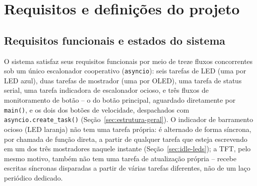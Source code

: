 \documentclass[12pt,a4paper]{article}
\begin{document}
\section{Requisitos e definições do projeto}
\label{sec:requisitos}

\subsection{Requisitos funcionais e estados do sistema}

O sistema satisfaz seus requisitos funcionais por meio de treze fluxos concorrentes sob um único escalonador cooperativo (\texttt{asyncio}): seis tarefas de LED (uma por LED azul), duas tarefas de mostrador (uma por OLED), uma tarefa de status serial, uma tarefa indicadora de escalonador ocioso, e três fluxos de monitoramento de botão -- o do botão principal, aguardado diretamente por \texttt{main()}, e os dois dos botões de velocidade, despachados com \texttt{asyncio.create\_task()} (Seção~\ref{sec:estrutura-geral}). O indicador de barramento ocioso (LED laranja) não tem uma tarefa própria: é alternado de forma síncrona, por chamada de função direta, a partir de qualquer tarefa que esteja escrevendo em um dos três mostradores naquele instante (Seção~\ref{sec:idle-leds}); a TFT, pelo mesmo motivo, também não tem uma tarefa de atualização própria -- recebe escritas síncronas disparadas a partir de várias tarefas diferentes, não de um laço periódico dedicado.
\end{document}
